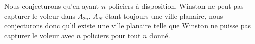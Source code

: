 Nous conjecturons qu'en ayant $n$ policiers à disposition, Winston ne peut pas capturer le voleur dans $A_{2n}$. $A_N$ étant toujours une ville planaire, nous conjecturons donc qu'il existe une ville planaire telle que Winston ne puisse pas capturer le voleur avec $n$ policiers pour tout $n$ donné.


